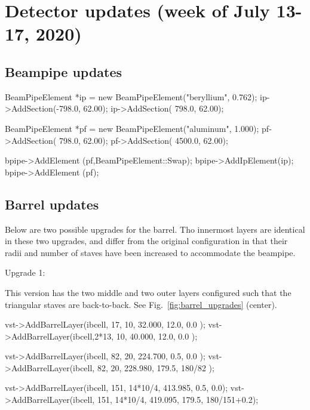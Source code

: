 \documentclass[12pt]{article}
\begin{document}
\section{Detector updates (week of July 13-17, 2020)}

\subsection{Beampipe updates}

\begin{tcolorbox}
\begin{verbnobox}[\scriptsize]
BeamPipeElement *ip = new BeamPipeElement("beryllium", 0.762);
ip->AddSection(-798.0, 62.00);
ip->AddSection( 798.0, 62.00);

BeamPipeElement *pf = new BeamPipeElement("aluminum", 1.000);
pf->AddSection(  798.0, 62.00);
pf->AddSection( 4500.0, 62.00);

bpipe->AddElement  (pf,BeamPipeElement::Swap);
bpipe->AddIpElement(ip);
bpipe->AddElement  (pf);
\end{verbnobox}  
\end{tcolorbox}

\subsection{Barrel updates}

Below are two possible upgrades for the barrel. Tho innermost layers are identical in these two upgrades,
and differ from the original configuration in that their radii and number of staves have been increased to accommodate the
beampipe.

Upgrade 1:

This version has the two middle and two outer layers configured such that the triangular
staves are back-to-back. See Fig.~\ref{fig:barrel_upgrades} (center).
\begin{tcolorbox}
\begin{verbnobox}[\scriptsize]
vst->AddBarrelLayer(ibcell,  17,      10,  32.000,  12.0, 0.0        );
vst->AddBarrelLayer(ibcell,2*13,      10,  40.000,  12.0, 0.0        );

vst->AddBarrelLayer(ibcell,  82,      20, 224.700,   0.5, 0.0        );
vst->AddBarrelLayer(ibcell,  82,      20, 228.980, 179.5, 180/82     );

vst->AddBarrelLayer(ibcell, 151, 14*10/4, 413.985,   0.5,         0.0);
vst->AddBarrelLayer(ibcell, 151, 14*10/4, 419.095, 179.5, 180/151+0.2);
\end{verbnobox}  
\end{tcolorbox}
\end{document}
